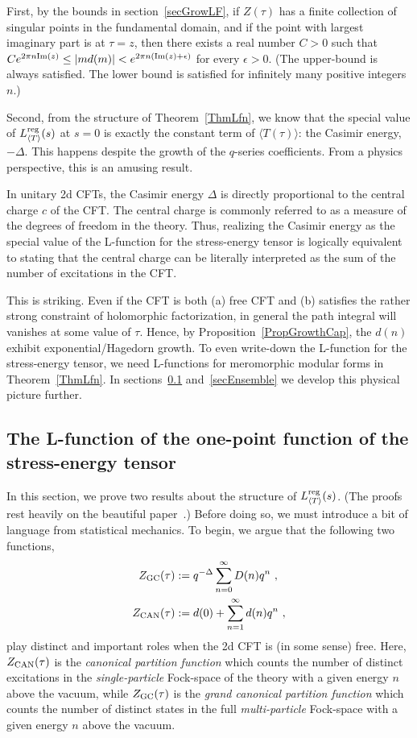 \documentclass[11pt,a4paper]{article}
\newcommand{\e}{\epsilon}
\newcommand{\reg}{{\rm reg}}
\begin{document}
First, by the bounds in section~\ref{secGrowLF}, if $Z(\tau)$ has a finite collection of singular points in the fundamental domain, and if the point with largest imaginary part is at $\tau = z$, then there exists a real number $C > 0$ such that $C e^{2 \pi n {\rm Im}(z)} \leq  |m d(m)| < e^{2 \pi n ({\rm Im}(z) + \e)}$ for every $\e > 0$. (The upper-bound is always satisfied. The lower bound is satisfied for infinitely many positive integers $n$.)

Second, from the structure of Theorem~\ref{ThmLfn}, we know that the special value of $L_{\langle T \rangle}^\reg(s)$ at $s = 0$ is exactly the constant term of $\langle T(\tau) \rangle$: the Casimir energy, $-\Delta$. This happens despite the growth of the $q$-series coefficients. From a physics perspective, this is an amusing result.

In unitary 2d CFTs, the Casimir energy $\Delta$ is directly proportional to the central charge $c$ of the CFT. The central charge is commonly referred to as a measure of the degrees of freedom in the theory. Thus, realizing the Casimir energy as the special value of the L-function for the stress-energy tensor is logically equivalent to stating that the central charge can be literally interpreted as the sum of the number of excitations in the CFT.

This is striking. Even if the CFT is both (a) free CFT and (b) satisfies the rather strong constraint of holomorphic factorization, in general the path integral will vanishes at some value of $\tau$. Hence, by Proposition~\ref{PropGrowthCap}, the $d(n)$ exhibit exponential/Hagedorn growth. To even write-down the L-function for the stress-energy tensor, we need L-functions for meromorphic modular forms in Theorem~\ref{ThmLfn}. In sections~\ref{secSTL} and~\ref{secEnsemble} we develop this physical picture further. 


\subsection{The L-function of the one-point function of the stress-energy tensor}\label{secSTL}

In this section, we prove two results about the structure of $L_{\langle T \rangle}^\reg(s)$. (The proofs rest heavily on the beautiful paper~\cite{22-DivisorsMF2}.) Before doing so, we must introduce a bit of language from statistical mechanics. To begin, we argue that the following two functions,
\begin{align}
Z_{\rm GC}(\tau)&:= q^{-\Delta} \sum_{n = 0}^{\infty} D(n)q^n ~, 
\label{eqZgc} 
\\
Z_{\rm CAN}(\tau)&:= d(0) + \sum_{n = 1}^{\infty} d(n) q^n~, 
\label{eqZcan}
\end{align}
play distinct and important roles when the 2d CFT is (in some sense) free. Here, $Z_{\rm CAN}(\tau)$ is the {\em canonical partition function} which counts the number of distinct excitations in the {\em single-particle} Fock-space of the theory with a given energy $n$ above the vacuum, while $Z_{\rm GC}(\tau)$ is the {\em grand canonical partition function} which counts the number of distinct states in the full {\em multi-particle} Fock-space with a given energy $n$ above the vacuum.
\end{document}
